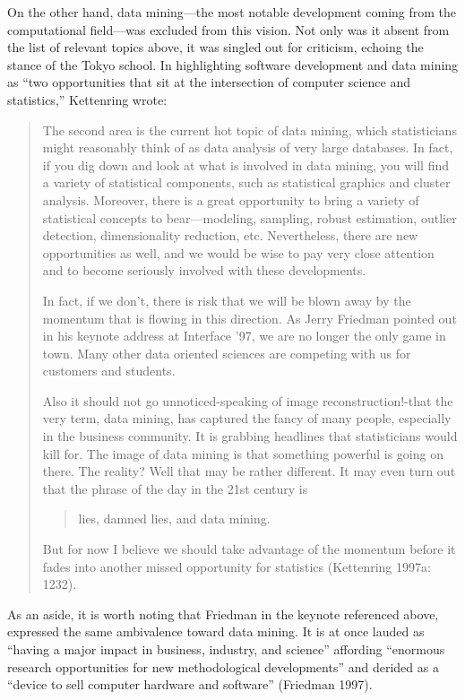 \documentclass[
  letterpaper,
]{report}
\begin{document}
On the other hand, data mining---the most notable development coming
from the computational field---was excluded from this vision. Not only
was it absent from the list of relevant topics above, it was singled out
for criticism, echoing the stance of the Tokyo school. In highlighting
software development and data mining as ``two opportunities that sit at
the intersection of computer science and statistics,'' Kettenring wrote:

\begin{quote}
The second area is the current hot topic of data mining, which
statisticians might reasonably think of as data analysis of very large
databases. In fact, if you dig down and look at what is involved in data
mining, you will find a variety of statistical components, such as
statistical graphics and cluster analysis. Moreover, there is a great
opportunity to bring a variety of statistical concepts to
bear---modeling, sampling, robust estimation, outlier detection,
dimensionality reduction, etc. Nevertheless, there are new opportunities
as well, and we would be wise to pay very close attention and to become
seriously involved with these developments.

In fact, if we don't, there is risk that we will be blown away by the
momentum that is flowing in this direction. As Jerry Friedman pointed
out in his keynote address at Interface '97, we are no longer the only
game in town. Many other data oriented sciences are competing with us
for customers and students.

Also it should not go unnoticed-speaking of image reconstruction!-that
the very term, data mining, has captured the fancy of many people,
especially in the business community. It is grabbing headlines that
statisticians would kill for. The image of data mining is that something
powerful is going on there. The reality? Well that may be rather
different. It may even turn out that the phrase of the day in the 21st
century is

\begin{quote}
lies, damned lies, and data mining.
\end{quote}

But for now I believe we should take advantage of the momentum before it
fades into another missed opportunity for statistics (Kettenring 1997a:
1232).
\end{quote}

As an aside, it is worth noting that Friedman in the keynote referenced
above, expressed the same ambivalence toward data mining. It is at once
lauded as ``having a major impact in business, industry, and science''
affording ``enormous research opportunities for new methodological
developments'' and derided as a ``device to sell computer hardware and
software'' (Friedman 1997).
\end{document}
